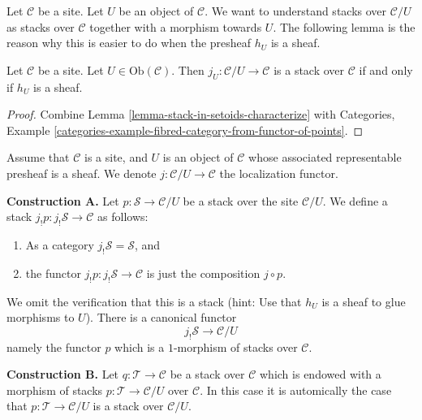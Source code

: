 \noindent
Let $\mathcal{C}$ be a site.
Let $U$ be an object of $\mathcal{C}$.
We want to understand stacks over $\mathcal{C}/U$ as stacks
over $\mathcal{C}$ together with a morphism towards $U$.
The following lemma is the reason why this is easier to do
when the presheaf $h_U$ is a sheaf.

\begin{lemma}
\label{lemma-when-localization-stack}
Let $\mathcal{C}$ be a site. Let $U \in \text{Ob}(\mathcal{C})$.
Then $j_U : \mathcal{C}/U \to \mathcal{C}$ is a stack over $\mathcal{C}$
if and only if $h_U$ is a sheaf.
\end{lemma}

\begin{proof}
Combine
Lemma \ref{lemma-stack-in-setoids-characterize}
with
Categories,
Example \ref{categories-example-fibred-category-from-functor-of-points}.
\end{proof}

\noindent
Assume that $\mathcal{C}$ is a site,
and $U$ is an object of $\mathcal{C}$ whose associated representable
presheaf is a sheaf. We denote $j : \mathcal{C}/U \to \mathcal{C}$
the localization functor.

\medskip\noindent
{\bf Construction A.} Let $p : \mathcal{S} \to \mathcal{C}/U$ be a stack
over the site $\mathcal{C}/U$. We define a stack
$j_!p : j_!\mathcal{S} \to \mathcal{C}$ as follows:
\begin{enumerate}
\item As a category $j_!\mathcal{S} = \mathcal{S}$, and
\item the functor $j_!p : j_!\mathcal{S} \to \mathcal{C}$
is just the composition $j \circ p$.
\end{enumerate}
We omit the verification that this is a stack (hint: Use that
$h_U$ is a sheaf to glue morphisms to $U$). There is a canonical
functor
$$
j_!\mathcal{S} \longrightarrow \mathcal{C}/U
$$
namely the functor $p$ which is a $1$-morphism of stacks over $\mathcal{C}$.

\medskip\noindent
{\bf Construction B.}
Let $q : \mathcal{T} \to \mathcal{C}$ be a stack over $\mathcal{C}$
which is endowed with a morphism of stacks $p : \mathcal{T} \to \mathcal{C}/U$
over $\mathcal{C}$. In this case it is automically the case that
$p : \mathcal{T} \to \mathcal{C}/U$ is a stack over $\mathcal{C}/U$.

